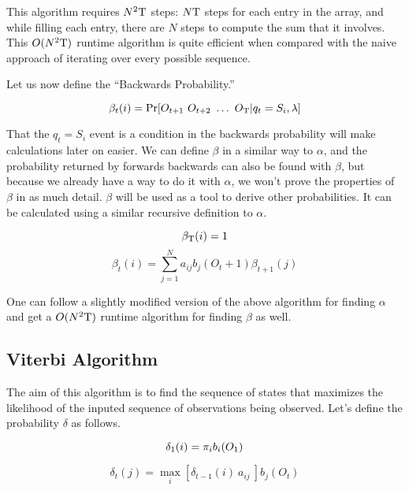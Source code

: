 This algorithm requires $N^2\mathrm{T}$ steps: $N\mathrm{T}$ steps for each entry in the
array, and while filling each entry, there are $N$ steps to compute the
sum that it involves. This $O(N^2\mathrm{T})$ runtime algorithm is quite
efficient when compared with the naive approach of iterating over every possible sequence.

Let us now define the ``Backwards Probability.''

\begin{equation}
  \beta_t(i) = \Pr[O_{t+1}\ O_{t+2}\ \ldots\ O_\Tau \vert q_t = S_i,
  \lambda]
\end{equation}

That the $q_t = S_i$ event is a condition in the backwards probability
will make calculations later on easier. We can define $\beta$ in a
similar way to $\alpha$, and the probability returned by forwards
backwards can also be found with $\beta$, but because we already have a way
to do it with $\alpha$, we won't prove the properties of $\beta$ in as
much detail. $\beta$ will be used as a tool to derive other probabilities.
It can be calculated using a similar recursive definition to $\alpha$.

\begin{equation}
  \beta_{\mathrm{T}}(i) = 1\\
\end{equation}
\begin{equation}
  \beta_t(i) = \sum_{j=1}^N a_{ij} b_j(O_t+1) \beta_{t+1}(j)
\end{equation}

One can follow a slightly modified version of the above algorithm for
finding $\alpha$ and get a $O(N^2\mathrm{T})$ runtime algorithm for finding
$\beta$ as well.

\subsection{Viterbi Algorithm}

The aim of this algorithm is to find the sequence of states that
maximizes the likelihood of the inputed sequence of observations being
observed. Let's define the probability $\delta$ as follows.

\begin{equation}
  \delta_1(i) = \pi_i b_i(O_1)\\
\end{equation}

\begin{equation}
  \delta_t(j) = \max_i[\delta_{t-1}(i)\ a_{ij}\ ] b_j(O_t)
\end{equation}

